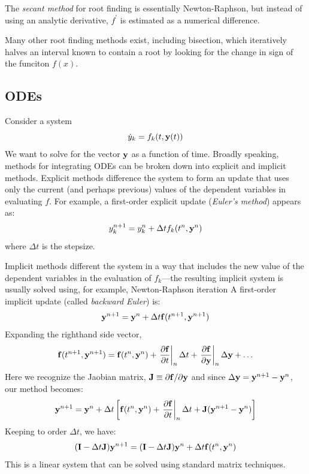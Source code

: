 The {\em secant method} for root finding is essentially
Newton-Raphson, but instead of using an analytic derivative,
$f^\prime$ is estimated as a numerical difference.

Many other root finding methods exist, including bisection, which
iteratively halves an interval known to contain a root by looking for
the change in sign of the funciton $f(x)$.

\subsection{ODEs}

Consider a system 
\begin{equation}
\dot{y}_k = f_k(t, {\bf y}(t))
\end{equation}
We want to solve for the vector ${\bf y}$ as a function of time.
Broadly speaking, methods for integrating ODEs can be broken down into
explicit and implicit methods.  Explicit methods difference the system
to form an update that uses only the current (and perhaps previous)
values of the dependent variables in evaluating $f$.  For example, a
first-order explicit update ({\em Euler's method}) appears as:
\begin{equation}
y^{n+1}_k = y^n_k + \Delta t f_k(t^n, {\bf y}^n)
\end{equation}
where $\Delta t$ is the stepsize. 

Implicit methods different the system in a way that includes the new
value of the dependent variables in the evaluation of $f_k$---the resulting
implicit system is usually solved using, for example, Newton-Raphson iteration
A first-order implicit update (called {\em backward Euler}) is:
\begin{equation}
{\bf y}^{n+1} = {\bf y}^n + \Delta t {\bf f}(t^{n+1}, {\bf y}^{n+1})
\end{equation}
Expanding the righthand side vector,
\begin{equation}
{\bf f}(t^{n+1},{\bf y}^{n+1}) = {\bf f}(t^n, {\bf y}^n) +
     \left . \frac{\partial {\bf f}}{\partial t} \right |_n \Delta t + 
     \left . \frac{\partial {\bf f}}{\partial {\bf y}} \right |_n \Delta {\bf y} + \ldots 
\end{equation} 
Here we recognize the Jaobian matrix, ${\bf J} \equiv \partial {\bf
  f}/\partial {\bf y}$ and since $\Delta {\bf y} = {\bf y}^{n+1} - {\bf y}^n$,
our method becomes:
\begin{equation}
{\bf y}^{n+1} = {\bf y}^n + \Delta t \left [
  {\bf f}(t^n, {\bf y}^n) +
     \left . \frac{\partial {\bf f}}{\partial t} \right |_n \Delta t + 
     {\bf J} ({\bf y}^{n+1} - {\bf y}^n) \right ]
\end{equation}
Keeping to order $\Delta t$, we have:
\begin{equation}
({\bf I} - \Delta t {\bf J}) {\bf y}^{n+1} = ({\bf I} - \Delta t {\bf J}) {\bf y}^n + \Delta t {\bf f}(t^n, {\bf y}^n)
\end{equation}
This is a linear system that can be solved using standard matrix techniques.

